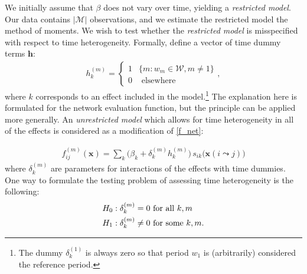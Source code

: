 \documentclass[a4paper,fleqn,11pt]{article}
\newcommand{\+}{\, + \,}
\begin{document}
We initially assume that $\beta$ does not vary over time, yielding a
\emph{restricted model}. Our data contains $|\mathcal{M}|$ observations, and we
estimate the restricted model the method of moments. We wish to test whether the
\emph{restricted model} is misspecified with respect to time
heterogeneity. Formally, define a vector of time dummy terms $\mathbf{h}$:
\begin{align}
h_k^{(m)}=\left\{
\begin{array}{ll}
1& \{m : w_m \in \mathcal{W}, m \neq 1\}\\
0& \mbox{~elsewhere~}
\end{array}
\right . ,
\end{align}
where $k$ corresponds to an effect included in the model.\footnote{The dummy
  $\delta_k^{(1)}$ is always zero so that period $w_1$ is (arbitrarily)
  considered the reference period.} The explanation here
is formulated for the network evaluation function,
but the principle can be applied more generally.
An \emph{unrestricted model} which allows
for time heterogeneity in all of the effects is considered as a modification of
\eqref{f_net}:

\begin{align}
f^{(m)}_{ij}(\mathbf{x})= \sum_k \Big(\beta_k + \delta_k^{(m)} h_k^{(m)}\Big)
           \, s_{ik}\big(\mathbf{x}(i \leadsto j)\big)
\label{eq:fmij2}
\end{align}
where $\delta_k^{(m)}$ are parameters for interactions of the effects
with time dummies. One way
to formulate the testing problem of assessing time heterogeneity is the
following:
\begin{align}
H_0:\delta_k^{(m)} = 0 & \mbox{~for all~} k,m \notag\\
H_1:\delta_k^{(m)} \neq 0 & \mbox{ for some } k,m .
\label{hyptest}
\end{align}
\end{document}
